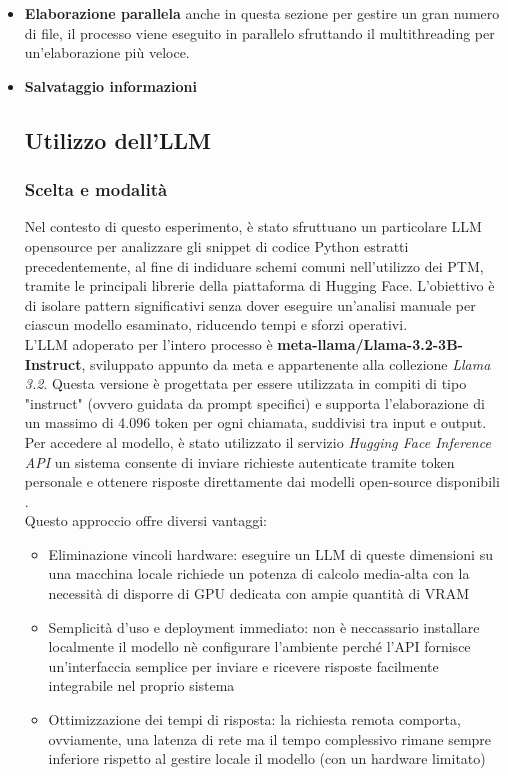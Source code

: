 \documentclass{article}
\begin{document}
\begin{itemize}
    \item \textbf{Elaborazione parallela} anche in questa sezione per gestire un gran numero di file, il processo viene eseguito in parallelo sfruttando il multithreading per un'elaborazione più veloce.

    \item \textbf{Salvataggio informazioni}




\subsection{Utilizzo dell'LLM}
\subsubsection{Scelta e modalità}
Nel contesto di questo esperimento, è stato sfruttuano un particolare LLM opensource per analizzare gli snippet di codice Python estratti precedentemente, al fine di indiduare schemi comuni nell'utilizzo dei PTM, tramite le principali librerie della piattaforma di Hugging Face.
L'obiettivo è di isolare pattern significativi senza dover eseguire un'analisi manuale per ciascun modello esaminato, riducendo tempi e sforzi operativi.\\
L'LLM adoperato per l'intero processo è \textbf{meta-llama/Llama-3.2-3B-Instruct}, sviluppato appunto da meta e appartenente alla collezione \textit{Llama 3.2}. Questa versione è progettata per essere utilizzata in compiti di tipo "instruct" (ovvero guidata da prompt specifici) e supporta l’elaborazione di un massimo di 4.096 token per ogni chiamata, suddivisi tra input e output.  
Per accedere al modello, è stato utilizzato il servizio \textit{Hugging Face Inference API} un sistema consente di inviare richieste autenticate tramite token personale e ottenere risposte direttamente dai modelli open-source disponibili .\\
Questo approccio offre diversi vantaggi:
\begin{itemize}
    \item Eliminazione vincoli hardware: eseguire un LLM di queste dimensioni su una macchina locale richiede un potenza di calcolo media-alta con la necessità di disporre di GPU dedicata con ampie quantità di VRAM
    \item Semplicità d'uso e deployment immediato: non è neccassario installare localmente il modello nè configurare l'ambiente perché l'API fornisce un'interfaccia semplice per inviare e ricevere risposte facilmente integrabile nel proprio sistema
    \item Ottimizzazione dei tempi di risposta: la richiesta remota comporta, ovviamente, una latenza di rete ma il tempo complessivo rimane sempre inferiore rispetto al gestire locale il modello (con un hardware limitato)
\end{itemize}


\end{itemize}
\end{document}
